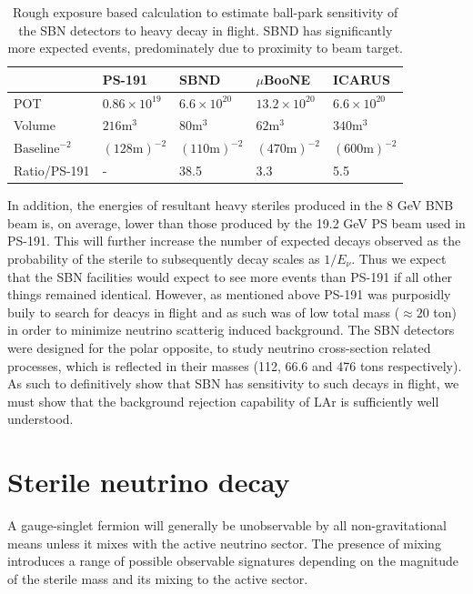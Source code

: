 \documentclass[11pt, a4paper]{article}
\begin{document}
\begin{table}[h!]
\centering
\begin{tabular}{| l || l | l | l | l |}
	\hline
	& PS-191 & SBND & $\mu$BooNE & ICARUS \\ \hline \hline
	POT	& $0.86 \times 10^{19}$	& $6.6 \times 10^{20}$	&	$13.2 \times 10^{20}$     &  $6.6 \times 10^{20}$ \\ \hline
	Volume	& $216\text{m}^3$	&	$80\text{m}^3$	&	$62\text{m}^3$	     &   $340\text{m}^3$	\\ \hline
	$\text{Baseline}^{-2}$	& $(128 	\text{m} )^{-2}$	&$(110 \text{m} )^{-2}$	&	$(470 \text{m} )^{-2}$			     & $(600 \text{m} )^{-2}$	  \\ \hline
Ratio/PS-191 & - 	& 38.5 	& 3.3	& 5.5\\ \hline
\end{tabular}
\caption{\label{tab:exposure} Rough exposure based calculation to estimate ball-park sensitivity of the SBN detectors to heavy decay in flight. SBND has significantly more expected events, predominately due to proximity to beam target.  }
\end{table}

In addition, the energies of resultant heavy steriles produced in the 8 GeV BNB beam is, on average, lower than those produced by the 19.2 GeV PS beam used in PS-191. This will further increase the number of expected decays observed as the probability of the sterile to subsequently decay scales as $1/E_\nu$. Thus we expect that the SBN facilities would expect to see more events than PS-191 if all other things remained identical. However, as mentioned above PS-191 was purposidly buily to search for deacys in flight and as such was of low total mass ($\approx 20 $ ton) in order to minimize neutrino scatterig induced background. The SBN detectors were designed for the polar opposite, to study neutrino cross-section related processes, which is reflected in their masses (112, 66.6 and 476 tons respectively). As such to definitively show that SBN has sensitivity to such decays in flight, we must show that the background rejection capability of LAr is sufficiently well understood.

\section{Sterile neutrino decay}

A gauge-singlet fermion will generally be unobservable by all non-gravitational
means unless it mixes with the active neutrino sector. The presence of mixing
introduces a range of possible observable signatures depending on the magnitude
of the sterile mass and its mixing to the active sector. 
\end{document}
